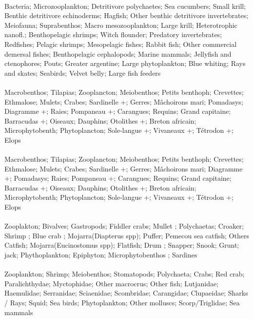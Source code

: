 \fullhline
\hline
{} \\
\hline
Bacteria; Microzooplankton; Detritivore polychaetes; Sea cucumbers; Small krill; Benthic detritivore echinoderms; Hagfish; Other benthic detritivore invertebrates; Meiofauna; Suprabenthos; Macro mesozooplankton; Large krill; Heterotrophic nanofl.; Benthopelagic shrimps; Witch flounder; Predatory invertebrates; Redfishes; Pelagic shrimps; Mesopelagic fishes; Rabbit fish; Other commercial demersal fishes; Benthopelagic cephalopods; Marine mammals; Jellyfish and ctenophores; Pouts; Greater argentine; Large phytoplankton; Blue whiting; Rays and skates; Seabirds; Velvet belly; Large fish feeders\\
\fullhline
\hline
{} \\
\hline
Macrobenthos; Tilapias; Zooplancton; Meiobenthos; Petits benthoph; Crevettes; Ethmalose; Mulets; Crabes; Sardinelle +; Gerres; Mâchoirons mari; Pomadasys; Diagramme +; Raies; Pompaneau +; Carangues; Requins; Grand capitaine; Barracudas +; Oiseaux; Dauphins; Otolithes +; Breton africain; Microphytobenth; Phytoplancton; Sole-langue +; Vivaneaux +; Tétrodon +; Elops\\
\fullhline
\hline
{} \\
\hline
Macrobenthos; Tilapias; Zooplancton; Meiobenthos; Petits benthoph; Crevettes; Ethmalose; Mulets; Crabes; Sardinelle +; Gerres; Mâchoirons mari; Diagramme +; Pomadasys; Raies; Pompaneau +; Carangues; Requins; Grand capitaine; Barracudas +; Oiseaux; Dauphins; Otolithes +; Breton africain; Microphytobenth; Phytoplancton; Sole-langue +; Vivaneaux +; Tétrodon +; Elops\\
\fullhline
\hline
{} \\
\hline
Zooplakton; Bivalves; Gastropods; Fiddler crabs; Mullet  ; Polychaetas; Croaker; Shrimp ; Blue crab ; Mojarra(Diapterus spp); Puffer; Pemecou sea catfish; Others Catfish; Mojarra(Eucinostomus spp); Flatfish; Drum ; Snapper; Snook; Grunt; jack; Phythoplankton; Epiphyton; Microphytobenthos ; Sardines\\
\fullhline
\hline
{} \\
\hline
Zooplankton; Shrimp; Meiobenthos; Stomatopods; Polychaeta; Crabs; Red crab; Paralichthydae; Myctophidae; Other macrocrus; Other fish; Lutjanidae; Haemulidae; Serranidae; Sciaenidae; Scombridae; Carangidae; Clupaeidae; Sharks / Rays; Squid; Sea birds; Phytoplankton; Other molluscs; Scorp/Triglidae; Sea mammals\\
